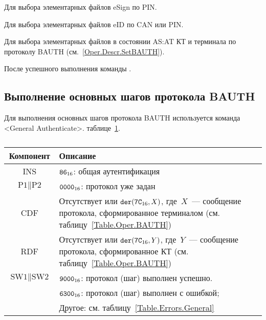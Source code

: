 Для выбора элементарных файлов  eSign 
 по PIN.

Для выбора элементарных файлов  eID 
 по CAN или PIN.

Для выбора элементарных файлов в состоянии AS:AT
 КТ и терминала
по протоколу BAUTH (см.~\ref{Oper.Descr.SetBAUTH}).

После успешного выполнения команды .


\subsection{Выполнение основных шагов протокола BAUTH}
\label{Oper.Descr.GABAUTH} 

Для выполнения основных шагов протокола BAUTH используется команда <General 
Authenticate>. 
 таблице~\ref{Table.Oper.GABAUTHCmd}.

\begin{table}[hbt]
\caption{}\label{Table.Oper.GABAUTHCmd}
\begin{tabular}{|c|p{14cm}|}
\hline
Компонент & 	Описание \\
\hline
\hline
INS & $\texttt{86}_{16}$: общая аутентификация \\
\hline
$\text{P1} \parallel \text{P2}$ & $\texttt{0000}_{16}$: протокол уже задан\\ 
\hline
CDF & Отсутствует или $\texttt{der}(\texttt{7C}_{16}, X)$, 
где~$X$~--- сообщение протокола, сформированное терминалом
(см. таблицу~\ref{Table.Oper.BAUTH})\\
\hline 
RDF & Отсутствует или $\texttt{der}(\texttt{7C}_{16}, Y)$, где~$Y$~--- 
сообщение протокола, сформированное КТ 
(см. таблицу~\ref{Table.Oper.BAUTH})\\
\hline
$\text{SW1} \parallel \text{SW2}$ & $\texttt{9000}_{16}$: протокол (шаг) выполнен успешно. \\
& $\texttt{6300}_{16}$: протокол (шаг) выполнен с ошибкой;\\
  & Другое: см. таблицу~\ref{Table.Errors.General} \\
\hline
\end{tabular}
\end{table}

